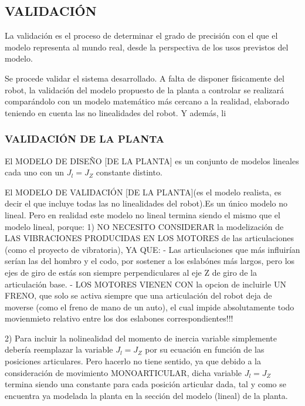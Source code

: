 \documentclass{article}
\begin{document}
\begin{sloppypar}
\subsection{VALIDACIÓN}
\label{sec:VALIDACIÓN}

La validación es el proceso de determinar el grado de precisión con el que el modelo representa al mundo real, desde la perspectiva de los usos previstos del modelo.

Se procede validar el sistema desarrollado. A falta de disponer físicamente del robot, la validación del modelo propuesto de la planta a controlar se realizará comparándolo con un modelo matemático más cercano a la realidad, elaborado teniendo en cuenta las no linealidades del robot. Y además, li

\subsubsection{VALIDACIÓN DE LA PLANTA}
\label{sec:VALIDACIÓN DE LA PLANTA}

El MODELO DE DISEÑO [DE LA PLANTA] es un conjunto de modelos lineales cada uno con un $J_l=J_Z$ constante distinto.

El MODELO DE VALIDACIÓN [DE LA PLANTA](es el modelo realista, es decir el que incluye todas las no linealidades del robot).Es un único modelo no lineal. Pero en realidad este modelo no lineal termina siendo el mismo que el modelo lineal, porque:
        1) NO NECESITO CONSIDERAR la modelización de LAS VIBRACIONES PRODUCIDAS EN LOS MOTORES de las articulaciones (como el proyecto de vibratoria), YA QUE:
                - Las articulaciones que más influirían serían las del hombro y el codo, por sostener a los eslabónes más largos, pero los ejes de giro de estás son siempre perpendiculares al eje Z de giro de la articulación base.
                - LOS MOTORES VIENEN CON la opcion de incluirle UN FRENO, que solo se activa siempre que una articulación del robot deja de moverse (como el freno de mano de un auto), el cual impide absolutamente todo movienmieto relativo entre los dos eslabones correspondientes!!! %

        2) Para incluir la nolinealidad del momento de inercia variable simplemente debería reemplazar la variable $J_l=J_Z$ por su ecuación en función de las posiciones articulares. Pero hacerlo no tiene sentido, ya que debido a la consideración de movimiento MONOARTICULAR, dicha variable $J_l=J_Z$ termina siendo una constante para cada posición articular dada, tal y como se encuentra ya modelada la planta en la sección del modelo (lineal) de la planta.


\end{sloppypar}
\end{document}
